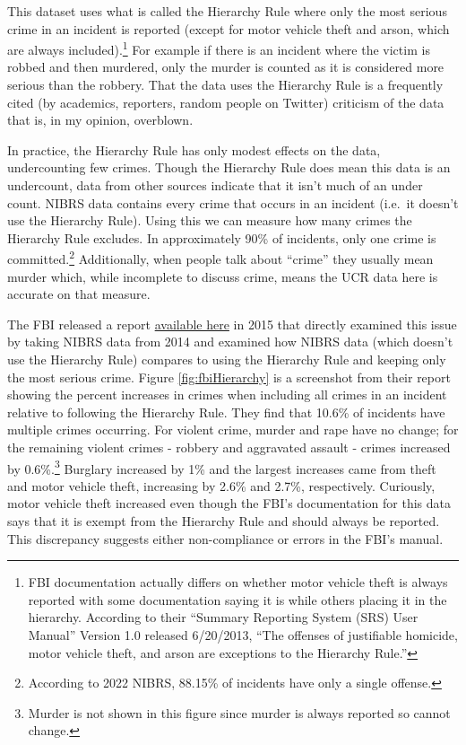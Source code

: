 \documentclass[
  12pt,
  openany]{book}
\begin{document}
This dataset uses what is called the Hierarchy Rule where only the most serious crime in an incident is reported (except for motor vehicle theft and arson, which are always included).\footnote{FBI documentation actually differs on whether motor vehicle theft is always reported with some documentation saying it is while others placing it in the hierarchy. According to their ``Summary Reporting System (SRS) User Manual'' Version 1.0 released 6/20/2013, ``The offenses of justifiable homicide, motor vehicle theft, and arson are exceptions to the Hierarchy Rule.''} For example if there is an incident where the victim is robbed and then murdered, only the murder is counted as it is considered more serious than the robbery. That the data uses the Hierarchy Rule is a frequently cited (by academics, reporters, random people on Twitter) criticism of the data that is, in my opinion, overblown.

In practice, the Hierarchy Rule has only modest effects on the data, undercounting few crimes. Though the Hierarchy Rule does mean this data is an undercount, data from other sources indicate that it isn't much of an under count. NIBRS data contains every crime that occurs in an incident (i.e.~it doesn't use the Hierarchy Rule). Using this we can measure how many crimes the Hierarchy Rule excludes. In approximately 90\% of incidents, only one crime is committed.\footnote{According to 2022 NIBRS, 88.15\% of incidents have only a single offense.} Additionally, when people talk about ``crime'' they usually mean murder which, while incomplete to discuss crime, means the UCR data here is accurate on that measure.

The FBI released a report \href{https://ucr.fbi.gov/nibrs/2014/resource-pages/effects_of_nibrs_on_crime_statistics_final.pdf}{available here} in 2015 that directly examined this issue by taking NIBRS data from 2014 and examined how NIBRS data (which doesn't use the Hierarchy Rule) compares to using the Hierarchy Rule and keeping only the most serious crime. Figure \ref{fig:fbiHierarchy} is a screenshot from their report showing the percent increases in crimes when including all crimes in an incident relative to following the Hierarchy Rule. They find that 10.6\% of incidents have multiple crimes occurring. For violent crime, murder and rape have no change; for the remaining violent crimes - robbery and aggravated assault - crimes increased by 0.6\%.\footnote{Murder is not shown in this figure since murder is always reported so cannot change.} Burglary increased by 1\% and the largest increases came from theft and motor vehicle theft, increasing by 2.6\% and 2.7\%, respectively. Curiously, motor vehicle theft increased even though the FBI's documentation for this data says that it is exempt from the Hierarchy Rule and should always be reported. This discrepancy suggests either non-compliance or errors in the FBI's manual.
\end{document}

